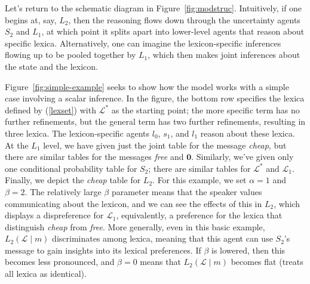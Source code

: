 \documentclass[12pt,twoside]{article}
\newcommand{\Figref}[1]{Figure~\ref{#1}}
\newcommand{\figref}[1]{Figure~\ref{#1}}
\newcommand{\subeg}[2]{(\ref{#2})}
\newcommand{\word}[1]{\emph{#1}}
\newcommand{\given}{\mid}
\newcommand{\Lex}{\mathcal{L}}
\newcommand{\LexStar}{\Lex^{\ast}}
\newcommand{\msg}{m}
\newcommand{\listenerZero}{l_{0}}
\newcommand{\speakerOne}{s_{1}}
\newcommand{\listenerOne}{l_{1}}
\newcommand{\SpeakerK}[1][k]{S_{#1}}
\newcommand{\ListenerK}[1][k]{L_{#1}}
\newcommand{\nullmsg}{\mathbf{0}}
\renewcommand{\_}{\textbf{\textunderscore\hspace{-4pt}\textunderscore\hspace{-3pt}\textunderscore\hspace{-4pt}\textunderscore}\hspace{0.5pt}}			%
\begin{document}
Let's return to the schematic diagram in
\figref{fig:modstruc}. Intuitively, if one begins at, say,
$\ListenerK[2]$, then the reasoning flows down through the uncertainty
agents $\SpeakerK[2]$ and $\ListenerK[1]$, at which point it splits
apart into lower-level agents that reason about specific lexica.
Alternatively, one can imagine the lexicon-specific inferences flowing
up to be pooled together by $\ListenerK[1]$, which then makes joint
inferences about the state and the lexicon.

\Figref{fig:simple-example} seeks to show how the model works with a
simple case involving a scalar inference. In the figure, the bottom
row specifies the lexica defined by \subeg{model-extend}{lexset} with
$\LexStar$ as the starting point; the more specific term has no
further refinements, but the general term has two further refinements,
resulting in three lexica. The lexicon-specific agents
$\listenerZero$, $\speakerOne$, and $\listenerOne$ reason about these
lexica. At the $\ListenerK[1]$ level, we have given just the joint
table for the message \word{cheap}, but there are similar tables for
the messages \word{free} and $\nullmsg$. Similarly, we've given only
one conditional probability table for $\SpeakerK[2]$; there are
similar tables for $\LexStar$ and $\Lex_{1}$. Finally, we depict the
\word{cheap} table for $\ListenerK[2]$. For this example, we set
$\alpha = 1$ and $\beta = 2$. The relatively large $\beta$ parameter
means that the speaker values communicating about the lexicon, and we
can see the effects of this in $\ListenerK[2]$, which displays a
dispreference for $\Lex_{1}$, equivalently, a preference for the
lexica that distinguish \word{cheap} from \word{free}. More generally,
even in this basic example, $\ListenerK[2](\Lex\given\msg)$
discriminates among lexica, meaning that this agent can use
$\SpeakerK[2]$'s message to gain insights into its lexical
preferences. If $\beta$ is lowered, then this becomes less pronounced,
and $\beta = 0$ means that $\ListenerK[2](\Lex\given\msg)$ becomes
flat (treats all lexica as identical).
\end{document}
